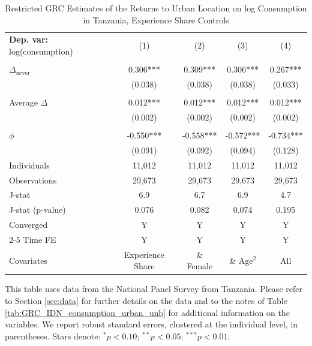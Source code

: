 \begin{table}[htbp] \centering \begin{threeparttable}
 \caption{Restricted GRC Estimates of the Returns to Urban Location on log Consumption in Tanzania, Experience Share Controls} 
 \label{tab:GRC_TZA_consumption_urban_unb_exp_sh} 
\begin{tabular}{l cccc} \toprule  \textbf{Dep. var:}  log(consumption) 
                    &\multicolumn{1}{c}{(1)}   &\multicolumn{1}{c}{(2)}   &\multicolumn{1}{c}{(3)}   &\multicolumn{1}{c}{(4)}   \\
                    &               &               &               &               \\
\addlinespace
$\Delta_{\text{never}}$&       0.306***&       0.309***&       0.306***&       0.267***\\
                    &     (0.038)   &     (0.038)   &     (0.038)   &     (0.033)   \\
                    &               &               &               &               \\
\addlinespace
Average $\Delta$    &       0.012***&       0.012***&       0.012***&       0.012***\\
                    &     (0.002)   &     (0.002)   &     (0.002)   &     (0.002)   \\
                    &               &               &               &               \\
\addlinespace
$\phi$              &      -0.550***&      -0.558***&      -0.572***&      -0.734***\\
                    &     (0.091)   &     (0.092)   &     (0.094)   &     (0.128)   \\
\addlinespace
Individuals         &      11,012   &      11,012   &      11,012   &      11,012   \\
Observations        &      29,673   &      29,673   &      29,673   &      29,673   \\
J-stat              &         6.9   &         6.7   &         6.9   &         4.7   \\
J-stat (p-value)    &       0.076   &       0.082   &       0.074   &       0.195   \\
Converged           &           Y   &           Y   &           Y   &           Y   \\
\cmidrule{2-5} Time FE & Y & Y & Y & Y \\ Covariates & Experience Share & \& Female & \& Age$^2$ & All \\ \bottomrule \end{tabular} \begin{tablenotes}[flushleft] \footnotesize \item{This table uses data from the National Panel Survey from Tanzania. Please refer to Section \ref{sec:data} for further details on the data and to the notes of Table \ref{tab:GRC_IDN_consumption_urban_unb} for additional information on the variables. We report robust standard errors, clustered at the individual level, in parentheses. Stars denote: $^{*} p<0.10$; $^{**} p<0.05$; $^{***} p<0.01$.} \end{tablenotes} \end{threeparttable} \end{table}
